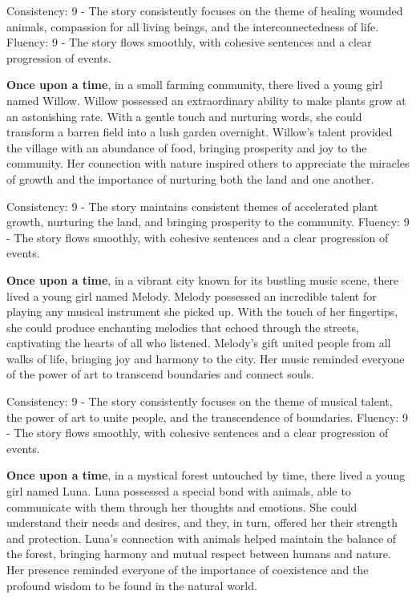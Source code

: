 \documentclass{article}
\begin{document}
Consistency: 9 - The story consistently focuses on the theme of healing wounded animals, compassion for all living beings, and the interconnectedness of life.
Fluency: 9 - The story flows smoothly, with cohesive sentences and a clear progression of events.

\textbf{Once upon a time}, in a small farming community, there lived a young girl named Willow. Willow possessed an extraordinary ability to make plants grow at an astonishing rate. With a gentle touch and nurturing words, she could transform a barren field into a lush garden overnight. Willow's talent provided the village with an abundance of food, bringing prosperity and joy to the community. Her connection with nature inspired others to appreciate the miracles of growth and the importance of nurturing both the land and one another.

Consistency: 9 - The story maintains consistent themes of accelerated plant growth, nurturing the land, and bringing prosperity to the community.
Fluency: 9 - The story flows smoothly, with cohesive sentences and a clear progression of events.

\textbf{Once upon a time}, in a vibrant city known for its bustling music scene, there lived a young girl named Melody. Melody possessed an incredible talent for playing any musical instrument she picked up. With the touch of her fingertips, she could produce enchanting melodies that echoed through the streets, captivating the hearts of all who listened. Melody's gift united people from all walks of life, bringing joy and harmony to the city. Her music reminded everyone of the power of art to transcend boundaries and connect souls.

Consistency: 9 - The story consistently focuses on the theme of musical talent, the power of art to unite people, and the transcendence of boundaries.
Fluency: 9 - The story flows smoothly, with cohesive sentences and a clear progression of events.

\textbf{Once upon a time}, in a mystical forest untouched by time, there lived a young girl named Luna. Luna possessed a special bond with animals, able to communicate with them through her thoughts and emotions. She could understand their needs and desires, and they, in turn, offered her their strength and protection. Luna's connection with animals helped maintain the balance of the forest, bringing harmony and mutual respect between humans and nature. Her presence reminded everyone of the importance of coexistence and the profound wisdom to be found in the natural world.
\end{document}
